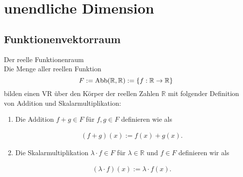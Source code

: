 \chapter{unendliche Dimension}
\label{sec:unendliche VRs}

\section{Funktionenvektorraum}
\theoremstyle{Satz}
\begin{Satz}{Der reelle Funktionenraum}
\label{funktionenraum}
\\ Die Menge aller reellen Funktion \[F :=  \operatorname{Abb}(\mathbb{R}, \mathbb{R}):= \{f : \mathbb{R} \rightarrow\mathbb{R}\}\]
bilden einen \acl{VR} über den Körper der reellen Zahlen $\mathbb{R}$ mit folgender Definition von Addition und Skalarmultiplikation:
\begin{enumerate}
	\item Die Addition $f+g\in F$ für $f,g \in F$ definieren wie als 
	
	\begin{align} (f+g)(x) := f(x)+ g(x)\text{.} \label{funkadd}
	\end{align}
	
	\item Die Skalarmultiplikation $\lambda \cdot f \in F$ für $\lambda \in \mathbb{R}$ und $f \in F$ definieren wir als 
	
	\begin{align}(\lambda \cdot f)(x) := \lambda \cdot f (x)\text{.}\label{funkskalmult} 
	\end{align}
		
\end{enumerate}
\end{Satz}

